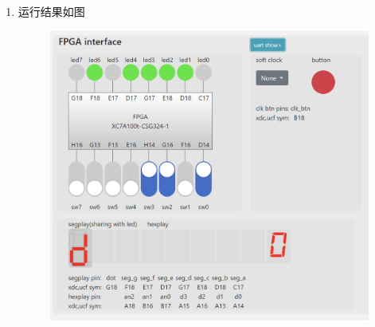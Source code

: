 \documentclass{article}
\begin{document}
\begin{enumerate}
        \item []运行结果如图
        \begin{figure}[htbp]
            \centering
            \includegraphics[scale=0.45]{r1.png}
        \end{figure}
    \end{enumerate}

    \clearpage
\end{document}
